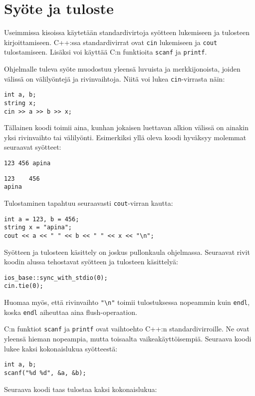 \section{Syöte ja tuloste}

Useimmissa kisoissa käytetään
standardivirtoja syötteen lukemiseen ja tulosteen
kirjoittamiseen.
C++:ssa standardivirrat ovat \texttt{cin}
lukemiseen
ja \texttt{cout} tulostamiseen. Lisäksi voi käyttää
C:n funktioita \texttt{scanf} ja \texttt{printf}.

Ohjelmalle tuleva syöte muodostuu yleensä
luvuista ja merkkijonoista,
joiden välissä on välilyöntejä ja rivinvaihtoja.
Niitä voi lukea \texttt{cin}-virrasta näin:

\begin{lstlisting}
int a, b;
string x;
cin >> a >> b >> x;
\end{lstlisting}

Tällainen koodi toimii aina,
kunhan jokaisen luettavan alkion välissä
on ainakin yksi rivinvaihto tai välilyönti.
Esimerkiksi yllä oleva koodi hyväksyy
molemmat seuraavat syötteet:
\begin{lstlisting}
123 456 apina
\end{lstlisting}
\begin{lstlisting}
123    456
apina
\end{lstlisting}
Tulostaminen tapahtuu seuraavasti
\texttt{cout}-virran kautta:

\begin{lstlisting}
int a = 123, b = 456;
string x = "apina";
cout << a << " " << b << " " << x << "\n";
\end{lstlisting}

Syötteen ja tulosteen käsittely on joskus
pullonkaula ohjelmassa.
Seuraavat rivit koodin alussa tehostavat
syötteen ja tulosteen käsittelyä:

\begin{lstlisting}
ios_base::sync_with_stdio(0);
cin.tie(0);
\end{lstlisting}

Huomaa myös, että rivinvaihto \texttt{"\textbackslash n"}
toimii tulostuksessa nopeammin kuin \texttt{endl},
koska \texttt{endl} aiheuttaa
aina flush-operaation.

C:n funktiot \texttt{scanf}
ja \texttt{printf} ovat vaihtoehto
C++:n standardivirroille.
Ne ovat yleensä hieman nopeampia,
mutta toisaalta vaikeakäyttöisempiä.
Seuraava koodi lukee kaksi kokonaislukua syötteestä:

\begin{lstlisting}
int a, b;
scanf("%d %d", &a, &b);
\end{lstlisting}
Seuraava koodi taas tulostaa kaksi kokonaislukua:

